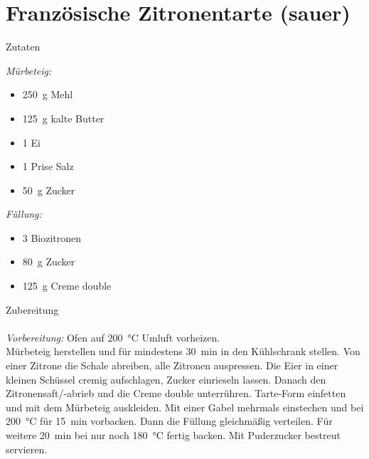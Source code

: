 \section*{Französische Zitronentarte (sauer)}
\ihead{}\ohead{}
\cfoot{}
{\Large Zutaten}
\begin{multicols}{2}
\textit{Mürbeteig:}
\begin{itemize}
    \item \SI{250}{g} Mehl
    \item \SI{125}{g} kalte Butter
    \item \num{1} Ei
    \item \num{1} Prise Salz
    \item \SI{50}{g} Zucker
\end{itemize}
\textit{Füllung:}
\begin{itemize}
    \item \num{3} Biozitronen
    \item \SI{80}{g} Zucker
    \item \SI{125}{g} Creme double
\end{itemize}
\end{multicols}
\noindent
{\Large Zubereitung}\\
\\
\textit{Vorbereitung:} Ofen auf \SI{200}{\celsius} Umluft vorheizen.\\
Mürbeteig herstellen und für mindestens \SI{30}{min} in den Kühlschrank stellen.
Von einer Zitrone die Schale abreiben, alle Zitronen auspressen.
Die Eier in einer kleinen Schüssel cremig aufschlagen, Zucker einrieseln lassen.
Danach den Zitronensaft/-abrieb und die Creme double unterrühren.
Tarte-Form einfetten und mit dem Mürbeteig auskleiden. 
Mit einer Gabel mehrmals einstechen und bei \SI{200}{\celsius} für \SI{15}{min} vorbacken. 
Dann die Füllung gleichmäßig verteilen.
Für weitere \SI{20}{min} bei nur noch \SI{180}{\celsius} fertig backen. 
Mit Puderzucker bestreut servieren.